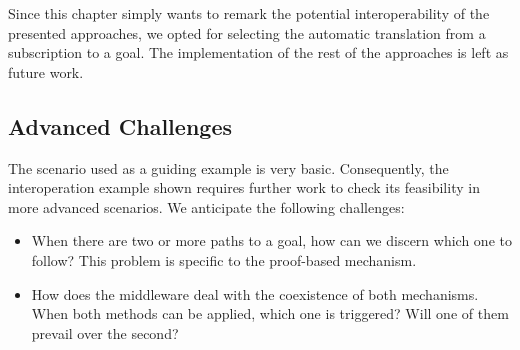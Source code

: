 Since this chapter simply wants to remark the potential interoperability of the presented approaches,
we opted for selecting the automatic translation from a subscription to a goal.
The implementation of the rest of the approaches is left as future work.



\subsection{Advanced Challenges} %

The scenario used as a guiding example is very basic.
Consequently, the interoperation example shown requires further work to check its feasibility in more advanced scenarios.
We anticipate the following challenges:
\begin{itemize}
  \item When there are two or more paths to a goal, how can we discern which one to follow?
	This problem is specific to the proof-based mechanism.
  \item How does the middleware deal with the coexistence of both mechanisms.
	When both methods can be applied, which one is triggered?
	Will one of them prevail over the second?
\end{itemize}